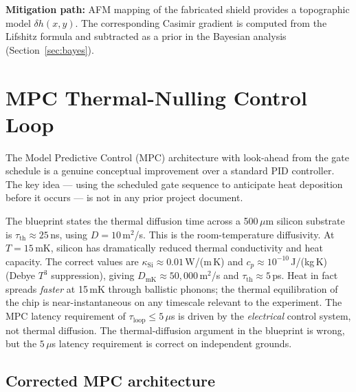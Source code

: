 \documentclass[11pt,letterpaper]{article}
\begin{document}
\textbf{Mitigation path:}  AFM mapping of the fabricated shield provides a topographic
model $\delta h(x,y)$.  The corresponding Casimir gradient is computed from the Lifshitz
formula and subtracted as a prior in the Bayesian analysis (Section~\ref{sec:bayes}).

\section{MPC Thermal-Nulling Control Loop}

\begin{auditpass}
The Model Predictive Control (MPC) architecture with look-ahead from the gate schedule
is a genuine conceptual improvement over a standard PID controller.  The key idea ---
using the scheduled gate sequence to anticipate heat deposition before it occurs ---
is not in any prior project document.
\end{auditpass}

\begin{auditfix}
The blueprint states the thermal diffusion time across a 500\,$\mu$m silicon substrate
is $\tau_{\mathrm{th}} \approx 25$\,ns, using $D = 10$\,m$^2$/s.  This is the room-temperature
diffusivity.  At $T = 15$\,mK, silicon has dramatically reduced thermal conductivity
and heat capacity.  The correct values are $\kappa_{\mathrm{Si}} \approx 0.01$\,W/(m\,K)
and $c_p \approx 10^{-10}$\,J/(kg\,K) (Debye $T^3$ suppression), giving
$D_{\mathrm{mK}} \approx 50{,}000$\,m$^2$/s and $\tau_{\mathrm{th}} \approx 5$\,ps.
Heat in fact spreads \emph{faster} at 15\,mK through ballistic phonons; the thermal
equilibration of the chip is near-instantaneous on any timescale relevant to the experiment.
The MPC latency requirement of $\tau_{\mathrm{loop}} \leq 5\,\mu$s is driven by the
\emph{electrical} control system, not thermal diffusion.  The thermal-diffusion argument
in the blueprint is wrong, but the $5\,\mu$s latency requirement is correct on independent
grounds.
\end{auditfix}

\subsection{Corrected MPC architecture}
\end{document}
